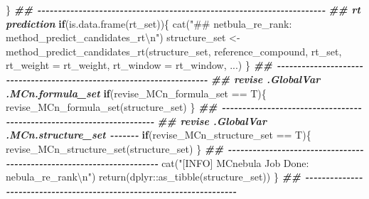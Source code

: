\documentclass[
]{article}
\newenvironment{Shaded}{\begin{snugshade}}{\end{snugshade}}
\newcommand{\AttributeTok}[1]{\textcolor[rgb]{0.77,0.63,0.00}{#1}}
\newcommand{\ControlFlowTok}[1]{\textcolor[rgb]{0.13,0.29,0.53}{\textbf{#1}}}
\newcommand{\DocumentationTok}[1]{\textcolor[rgb]{0.56,0.35,0.01}{\textbf{\textit{#1}}}}
\newcommand{\FunctionTok}[1]{\textcolor[rgb]{0.00,0.00,0.00}{#1}}
\newcommand{\NormalTok}[1]{#1}
\newcommand{\OtherTok}[1]{\textcolor[rgb]{0.56,0.35,0.01}{#1}}
\newcommand{\SpecialCharTok}[1]{\textcolor[rgb]{0.00,0.00,0.00}{#1}}
\newcommand{\StringTok}[1]{\textcolor[rgb]{0.31,0.60,0.02}{#1}}
\begin{document}
\begin{Shaded}
\begin{Highlighting}[]
\NormalTok{    \}}
    \DocumentationTok{\#\# {-}{-}{-}{-}{-}{-}{-}{-}{-}{-}{-}{-}{-}{-}{-}{-}{-}{-}{-}{-}{-}{-}{-}{-}{-}{-}{-}{-}{-}{-}{-}{-}{-}{-}{-}{-}{-}{-}{-}{-}{-}{-}{-}{-}{-}{-}{-}{-}{-}{-}{-}{-}{-}{-}{-}{-}{-}{-}{-}{-}{-}{-}{-}{-}{-}{-}{-}{-}{-}{-} }
    \DocumentationTok{\#\# rt prediction}
    \ControlFlowTok{if}\NormalTok{(}\FunctionTok{is.data.frame}\NormalTok{(rt\_set))\{}
      \FunctionTok{cat}\NormalTok{(}\StringTok{"\#\# netbula\_re\_rank: method\_predict\_candidates\_rt}\SpecialCharTok{\textbackslash{}n}\StringTok{"}\NormalTok{)}
\NormalTok{      structure\_set }\OtherTok{\textless{}{-}} \FunctionTok{method\_predict\_candidates\_rt}\NormalTok{(structure\_set, reference\_compound, rt\_set,}
                                                    \AttributeTok{rt\_weight =}\NormalTok{ rt\_weight, }\AttributeTok{rt\_window =}\NormalTok{ rt\_window, ...)}
\NormalTok{    \}}
    \DocumentationTok{\#\# {-}{-}{-}{-}{-}{-}{-}{-}{-}{-}{-}{-}{-}{-}{-}{-}{-}{-}{-}{-}{-}{-}{-}{-}{-}{-}{-}{-}{-}{-}{-}{-}{-}{-}{-}{-}{-}{-}{-}{-}{-}{-}{-}{-}{-}{-}{-}{-}{-}{-}{-}{-}{-}{-}{-}{-}{-}{-}{-}{-}{-}{-}{-}{-}{-}{-}{-}{-}{-}{-} }
    \DocumentationTok{\#\# revise .GlobalVar .MCn.formula\_set}
    \ControlFlowTok{if}\NormalTok{(revise\_MCn\_formula\_set }\SpecialCharTok{==}\NormalTok{ T)\{}
      \FunctionTok{revise\_MCn\_formula\_set}\NormalTok{(structure\_set)}
\NormalTok{    \}}
    \DocumentationTok{\#\# {-}{-}{-}{-}{-}{-}{-}{-}{-}{-}{-}{-}{-}{-}{-}{-}{-}{-}{-}{-}{-}{-}{-}{-}{-}{-}{-}{-}{-}{-}{-}{-}{-}{-}{-}{-}{-}{-}{-}{-}{-}{-}{-}{-}{-}{-}{-}{-}{-}{-}{-}{-}{-}{-}{-}{-}{-}{-}{-}{-}{-}{-}{-}{-}{-}{-}{-}{-}{-}{-} }
    \DocumentationTok{\#\# revise .GlobalVar .MCn.structure\_set {-}{-}{-}{-}{-}{-}{-}}
    \ControlFlowTok{if}\NormalTok{(revise\_MCn\_structure\_set }\SpecialCharTok{==}\NormalTok{ T)\{}
      \FunctionTok{revise\_MCn\_structure\_set}\NormalTok{(structure\_set)}
\NormalTok{    \}}
    \DocumentationTok{\#\# {-}{-}{-}{-}{-}{-}{-}{-}{-}{-}{-}{-}{-}{-}{-}{-}{-}{-}{-}{-}{-}{-}{-}{-}{-}{-}{-}{-}{-}{-}{-}{-}{-}{-}{-}{-}{-}{-}{-}{-}{-}{-}{-}{-}{-}{-}{-}{-}{-}{-}{-}{-}{-}{-}{-}{-}{-}{-}{-}{-}{-}{-}{-}{-}{-}{-}{-}{-}{-}{-} }
    \FunctionTok{cat}\NormalTok{(}\StringTok{"[INFO] MCnebula Job Done: nebula\_re\_rank}\SpecialCharTok{\textbackslash{}n}\StringTok{"}\NormalTok{)}
    \FunctionTok{return}\NormalTok{(dplyr}\SpecialCharTok{::}\FunctionTok{as\_tibble}\NormalTok{(structure\_set))}
\NormalTok{  \}}
\DocumentationTok{\#\# {-}{-}{-}{-}{-}{-}{-}{-}{-}{-}{-}{-}{-}{-}{-}{-}{-}{-}{-}{-}{-}{-}{-}{-}{-}{-}{-}{-}{-}{-}{-}{-}{-}{-}{-}{-}{-}{-}{-}{-}{-}{-}{-}{-}{-}{-}{-}{-}{-}{-}{-}{-}{-}{-}{-}{-}{-}{-}{-}{-}{-}{-}{-}{-}{-}{-}{-}{-}{-}{-} }

\end{Highlighting}
\end{Shaded}
\end{document}
